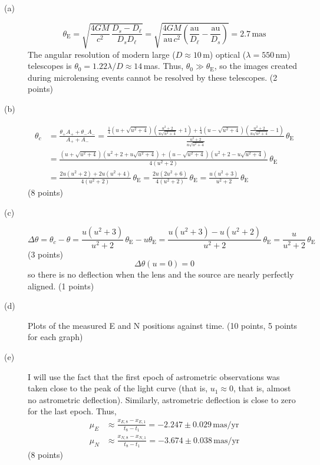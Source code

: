 \begin{description}
\item[(a)]
  \[
    \theta_{\mathrm{E}}
    = \sqrt{\frac{4GM}{c^2}\,\frac{D_s - D_\ell}{D_s D_\ell}}
    = \sqrt{\frac{4GM}{\mathrm{au}\,c^2}
      \left(\frac{\mathrm{au}}{D_\ell} - \frac{\mathrm{au}}{D_s}\right)}
    = 2.7\,\mathrm{mas}
  \]
  The angular resolution of modern large ($D \approx 10$\,m) optical
  ($\lambda = 550$\,nm) telescopes is
  $\theta_0 = 1.22\lambda/D \approx 14$\,mas. Thus,
  $\theta_0 \gg \theta_{\mathrm{E}}$, so the images created during
  microlensing events cannot be resolved by these telescopes.
  \hfill(2 points)

\item[(b)]
  \begin{align*}
    \theta_c &= \frac{\theta_+ A_+ + \theta_- A_-}{A_+ + A_-}
    = \frac{\frac{1}{4}\left(u + \sqrt{u^2+4}\right)
        \left(\frac{u^2+2}{u\sqrt{u^2+4}} + 1\right)
      + \frac{1}{4}\left(u - \sqrt{u^2+4}\right)
        \left(\frac{u^2+2}{u\sqrt{u^2+4}} - 1\right)}
      {\frac{u^2+2}{u\sqrt{u^2+4}}}\,\theta_{\mathrm{E}}\\
    &= \frac{\left(u + \sqrt{u^2+4}\right)
        \left(u^2 + 2 + u\sqrt{u^2+4}\right)
      + \left(u - \sqrt{u^2+4}\right)
        \left(u^2 + 2 - u\sqrt{u^2+4}\right)}
      {4(u^2+2)}\,\theta_{\mathrm{E}}\\
    &= \frac{2u(u^2+2) + 2u(u^2+4)}{4(u^2+2)}\,\theta_{\mathrm{E}}
    = \frac{2u(2u^2+6)}{4(u^2+2)}\,\theta_{\mathrm{E}}
    = \frac{u(u^2+3)}{u^2+2}\,\theta_{\mathrm{E}}
  \end{align*}
  \hfill(8 points)

\item[(c)]
  \[
    \Delta\theta = \theta_c - \theta
    = \frac{u(u^2+3)}{u^2+2}\,\theta_{\mathrm{E}} - u\theta_{\mathrm{E}}
    = \frac{u(u^2+3) - u(u^2+2)}{u^2+2}\,\theta_{\mathrm{E}}
    = \frac{u}{u^2+2}\,\theta_{\mathrm{E}}
  \]
  \hfill(3 points)
  \[
    \Delta\theta(u = 0) = 0
  \]
  so there is no deflection when the lens and the source are nearly
  perfectly aligned. \hfill(1 points)

\item[(d)] Plots of the measured E and N positions against time.
  \hfill(10 points, 5 points for each graph)

\item[(e)] I will use the fact that the first epoch of astrometric
  observations was taken close to the peak of the light curve (that is,
  $u_1 \approx 0$, that is, almost no astrometric deflection). Similarly,
  astrometric deflection is close to zero for the last epoch. Thus,
  \begin{align*}
    \mu_E &\approx \frac{x_{E,8} - x_{E,1}}{t_8 - t_1}
      = -2.247 \pm 0.029\,\mathrm{mas/yr}\\
    \mu_N &\approx \frac{x_{N,8} - x_{N,1}}{t_8 - t_1}
      = -3.674 \pm 0.038\,\mathrm{mas/yr}
  \end{align*}
  \hfill(8 points)


\end{description}
